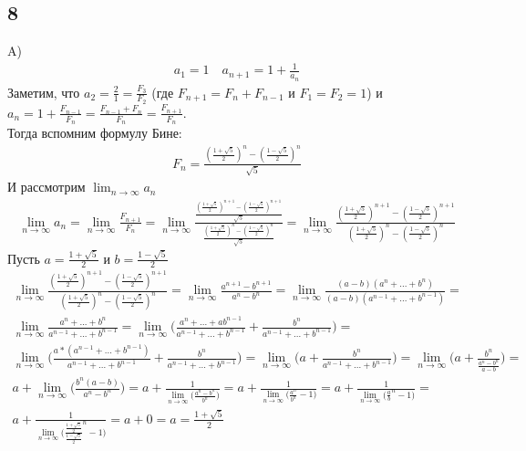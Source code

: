 		\subsection{8}
		A)\\
		\begin{gather*}
		a_1 = 1 \quad a_{n+1} = 1 + \frac{1}{a_n} 
		\end{gather*}
		Заметим, что $a_2 = \frac{2}{1} = \frac{F_3}{F_2}$ (где $F_{n+1} = F_{n} + F_{n-1}$ и $F_1 = F_2 = 1$) и $a_n = 1 + \frac{F_{n-1}}{F_{n}} = \frac{F_{n-1} + F_{n}}{F_{n}} = \frac{F_{n+1}}{F_{n}}$.\\
		Тогда вспомним формулу Бине: 
		\begin{gather*}
		F_n = \frac{(\frac{1 + \sqrt{5}}{2})^n - (\frac{1 - \sqrt{5}}{2})^n}{\sqrt{5}}
		\end{gather*}
		И рассмотрим $\lim_{n \to \infty}a_n$
		\begin{gather*}
		\lim_{n \to \infty}a_n = \lim_{n \to \infty} \frac{F_{n+1}}{F_{n}} = 
		\lim_{n \to \infty} \frac{\frac{(\frac{1 + \sqrt{5}}{2})^{n+1} - (\frac{1 - \sqrt{5}}{2})^{n+1}}{\sqrt{5}}}{\frac{(\frac{1 + \sqrt{5}}{2})^n - (\frac{1 - \sqrt{5}}{2})^n}{\sqrt{5}}} = 
		\lim_{n \to \infty} \frac{(\frac{1 + \sqrt{5}}{2})^{n+1} - (\frac{1 - \sqrt{5}}{2})^{n+1}}{(\frac{1 + \sqrt{5}}{2})^n - (\frac{1 - \sqrt{5}}{2})^n}
		\end{gather*}
		Пусть $a = \frac{1 + \sqrt{5}}{2}$ и $b = \frac{1 - \sqrt{5}}{2}$
		\begin{gather*}
		\lim_{n \to \infty} \frac{(\frac{1 + \sqrt{5}}{2})^{n+1} - (\frac{1 - \sqrt{5}}{2})^{n+1}}{(\frac{1 + \sqrt{5}}{2})^n - (\frac{1 - \sqrt{5}}{2})^n} = 
		\lim_{n \to \infty} \frac{a^{n+1} - b^{n+1}}{a^n - b^n} = 
		\lim_{n \to \infty} \frac{(a - b)(a^{n} + ... + b^{n})}{(a - b)(a^{n-1} + ... + b^{n-1})} = \\
		\lim_{n \to \infty} \frac{a^{n} + ... + b^{n}}{a^{n-1} + ... + b^{n-1}} = 
		\lim_{n \to \infty} \biggl( \frac{a^{n} + ... + ab^{n-1}}{a^{n-1} + ... + b^{n-1}}  + \frac{b^{n}}{a^{n-1} + ... + b^{n-1}} \biggl)= \\
		\lim_{n \to \infty} \biggl( \frac{a * (a^{n-1} + ... + b^{n-1})}{a^{n-1} + ... + b^{n-1}}  + \frac{b^{n}}{a^{n-1} + ... + b^{n-1}} \biggl)= 
		\lim_{n \to \infty} \biggl( a  + \frac{b^{n}}{a^{n-1} + ... + b^{n-1}} \biggl)= 
		\lim_{n \to \infty} \biggl( a  + \frac{b^{n}}{\frac{a^{n} - b^{n}}{a - b}} \biggl)= \\
		a  + \lim_{n \to \infty} \biggl(\frac{b^{n}(a - b)}{a^{n} - b^{n}} \biggl)= 
		a  + \frac{1}{\lim_{n \to \infty} \biggl(\frac{a^{n} - b^{n}}{b^{n}} \biggl)}= 
		a  + \frac{1}{\lim_{n \to \infty} \biggl(\frac{a^{n}}{b^{n}} - 1 \biggl)}= 
		a  + \frac{1}{\lim_{n \to \infty} \biggl(\frac{a}{b}^{n} - 1 \biggl)}= \\
		a  + \frac{1}{\lim_{n \to \infty} \biggl(\frac{\frac{1 + \sqrt{5}}{2}}{\frac{1 - \sqrt{5}}{2}}^{n} - 1 \biggl)}= 
		a + 0 =
		a = \frac{1 + \sqrt{5}}{2}
		\end{gather*}
